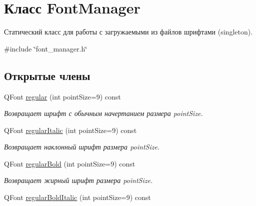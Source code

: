 \hypertarget{class_font_manager}{}\section{Класс Font\+Manager}
\label{class_font_manager}


Статический класс для работы с загружаемыми из файлов шрифтами (singleton).  




{\ttfamily \#include \char`\"{}font\+\_\+manager.\+h\char`\"{}}

\subsection*{Открытые члены}
\begin{DoxyCompactItemize}
\item 
\hypertarget{class_font_manager_ada97aa5e52356da1bc5e8ac73678d9b2}{}\label{class_font_manager_ada97aa5e52356da1bc5e8ac73678d9b2} 
Q\+Font \hyperlink{class_font_manager_ada97aa5e52356da1bc5e8ac73678d9b2}{regular} (int point\+Size=9) const
\begin{DoxyCompactList}\small\item\em Возвращает шрифт с обычным начертанием размера point\+Size. \end{DoxyCompactList}\item 
\hypertarget{class_font_manager_a2c5f2de0025fb15b0d3c2420eb7a1146}{}\label{class_font_manager_a2c5f2de0025fb15b0d3c2420eb7a1146} 
Q\+Font \hyperlink{class_font_manager_a2c5f2de0025fb15b0d3c2420eb7a1146}{regular\+Italic} (int point\+Size=9) const
\begin{DoxyCompactList}\small\item\em Возвращает наклонный шрифт размера point\+Size. \end{DoxyCompactList}\item 
\hypertarget{class_font_manager_aaefa52fc7e009d7395f0984df0067789}{}\label{class_font_manager_aaefa52fc7e009d7395f0984df0067789} 
Q\+Font \hyperlink{class_font_manager_aaefa52fc7e009d7395f0984df0067789}{regular\+Bold} (int point\+Size=9) const
\begin{DoxyCompactList}\small\item\em Возвращает жирный шрифт размера point\+Size. \end{DoxyCompactList}\item 
\hypertarget{class_font_manager_af67c9b0a46ba532a363893102a5ceb38}{}\label{class_font_manager_af67c9b0a46ba532a363893102a5ceb38} 
Q\+Font \hyperlink{class_font_manager_af67c9b0a46ba532a363893102a5ceb38}{regular\+Bold\+Italic} (int point\+Size=9) const

\end{DoxyCompactItemize}
